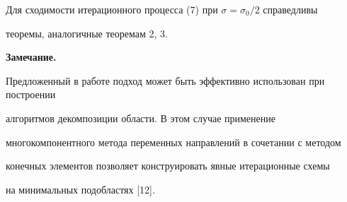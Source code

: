 Для сходимости итерационного процесса (7) при $\sigma=\sigma_0/2$ справедливы


теоремы, аналогичные теоремам 2, 3.


\medskip





{\bf Замечание.}


Предложенный в работе подход может быть эффективно использован при построении


алгоритмов декомпозиции области. В этом случае применение


многокомпонентного метода переменных направлений в сочетании с методом


конечных элементов позволяет конструировать явные итерационные схемы


на минимальных подобластях [12].





